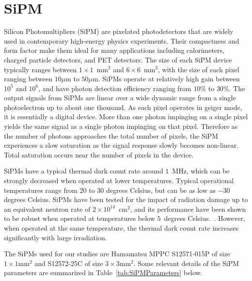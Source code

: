 \section{SiPM}
\label{sec:sipm}

Silicon Photomultipliers (SiPM) are pixelated photodetectors that are widely
used in contemporary high-energy physics experiments. Their compactness and form
factor make them ideal for many applications including calorimeters, charged
particle detectors, and PET detectors. The size of each SiPM device typically
ranges between $1\times 1$~$\mathrm{mm}^{2}$ and $6\times 6$~$\mathrm{mm}^{2}$,
with the size of each pixel ranging between $10\mu$m to $50\mu$m. SiPMs operate
at relatively high gain between $10^{5}$ and $10^{6}$, and have photon detection
efficiency ranging from $10\%$ to $30\%$. The output signals from SiPMs are
linear over a wide dynamic range from a single photoelectron up to about one
thousand. As each pixel operates in geiger mode, it is essentially a digital
device. More than one photon impinging on a single pixel yields the same signal
as a single photon impinging on that pixel. Therefore as the number of photons
approaches the total number of pixels, the SiPM experiences a slow saturation as
the signal response slowly becomes non-linear. Total saturation occurs near the
number of pixels in the device. 

SiPMs have a typical thermal dark count rate around $1$~MHz, which can be
strongly decreased when operated at lower temperatures. Typical operational
temperatures range from $20$ to $30$ degrees Celsius, but can be as low as $-30$
degrees Celsius. SiPMs have been tested for the impact of radiation damage up to
an equivalent neutron rate of $2\times10^{14}$~$\mathrm{cm}^{2}$, and its
performance have been shown to be robust when operated at temperatures below 
$5$~degrees Celsius.~\cite{SiPMIrradiated1,SiPMIrradiated2}. 
However, when operated at the same temperature, the thermal dark count rate increases
significantly with large irradiation.

The SiPMs used for our studies are Hamamatsu MPPC S12571-015P of 
size $1\times1\mathrm{mm}^{2}$ and S12572-25C of size 
$3\times3\mathrm{mm}^{2}$. Some relevant details of the SiPM parameters
are summarized in Table~\ref{tab:SiPMParameters} below.

